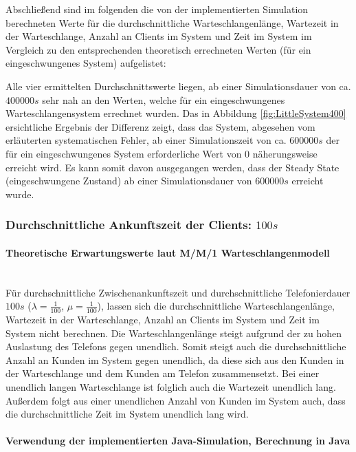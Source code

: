 Abschließend sind im folgenden die von der implementierten Simulation berechneten Werte für die durchschnittliche Warteschlangenlänge, Wartezeit in der Warteschlange, Anzahl an Clients im System und Zeit im System im Vergleich zu den entsprechenden theoretisch errechneten Werten (für ein eingeschwungenes System) aufgelistet:


Alle vier ermittelten Durchschnittswerte liegen, ab einer Simulationsdauer von ca. $400000s$ sehr nah an den Werten, welche für ein eingeschwungenes Warteschlangensystem errechnet wurden. Das in Abbildung  \ref{fig:LittleSystem400} ersichtliche Ergebnis der Differenz zeigt, dass das System, abgesehen vom erläuterten systematischen Fehler, ab einer Simulationszeit von ca. $600000s$ der für ein eingeschwungenes System erforderliche Wert von $0$ näherungsweise erreicht wird. Es kann somit davon ausgegangen werden, dass der Steady State (eingeschwungene Zustand) ab einer Simulationsdauer von $600000s$ erreicht wurde.

\subsubsection{Durchschnittliche Ankunftszeit der Clients: $100s$}
\paragraph{Theoretische Erwartungswerte laut M/M/1 Warteschlangenmodell}
\\
Für durchschnittliche Zwischenankunftszeit und durchschnittliche Telefonierdauer $100s$ ($\lambda=\frac{1}{100}$, $\mu=\frac{1}{100}$), lassen sich die durchschnittliche Warteschlangenlänge, Wartezeit in der Warteschlange, Anzahl an Clients im System und Zeit im System nicht berechnen. Die Warteschlangenlänge steigt aufgrund der zu hohen Auslastung des Telefons gegen unendlich. Somit steigt auch die durchschnittliche Anzahl an Kunden im System gegen unendlich, da diese sich aus den Kunden in der Warteschlange und dem Kunden am Telefon zusammensetzt. Bei einer unendlich langen Warteschlange ist folglich auch die Wartezeit unendlich lang. Außerdem folgt aus einer unendlichen Anzahl von Kunden im System auch, dass die durchschnittliche Zeit im System unendlich lang wird.

\paragraph{Verwendung der implementierten Java-Simulation, Berechnung in Java}

